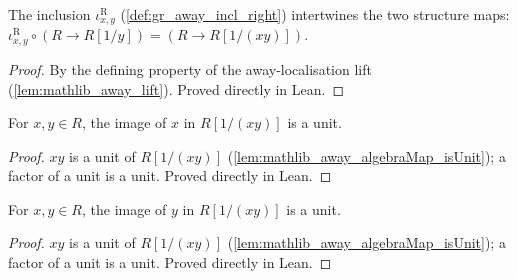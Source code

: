 \begin{lemma}\leanok
  \label{lem:gr_awayInclRight_comp_algebraMap}
  The inclusion \(\iota^{\mathrm{R}}_{x,y}\) (\cref{def:gr_away_incl_right})
  intertwines the two structure maps:
  \(\iota^{\mathrm{R}}_{x,y} \circ (R \to R[1/y]) = (R \to R[1/(xy)])\).
\end{lemma}
\begin{proof}

\leanok
  By the defining property of the away-localisation lift
  (\cref{lem:mathlib_away_lift}). Proved directly in Lean.
\end{proof}

\begin{lemma}\leanok
  \label{lem:gr_isUnit_algebraMap_away_left}
  For \(x, y \in R\), the image of \(x\) in \(R[1/(xy)]\) is a unit.
\end{lemma}
\begin{proof}

\leanok
  \(xy\) is a unit of \(R[1/(xy)]\)
  (\cref{lem:mathlib_away_algebraMap_isUnit}); a factor of a unit is a unit.
  Proved directly in Lean.
\end{proof}

\begin{lemma}\leanok
  \label{lem:gr_isUnit_algebraMap_away_right}
  For \(x, y \in R\), the image of \(y\) in \(R[1/(xy)]\) is a unit.
\end{lemma}
\begin{proof}

\leanok
  \(xy\) is a unit of \(R[1/(xy)]\)
  (\cref{lem:mathlib_away_algebraMap_isUnit}); a factor of a unit is a unit.
  Proved directly in Lean.
\end{proof}

